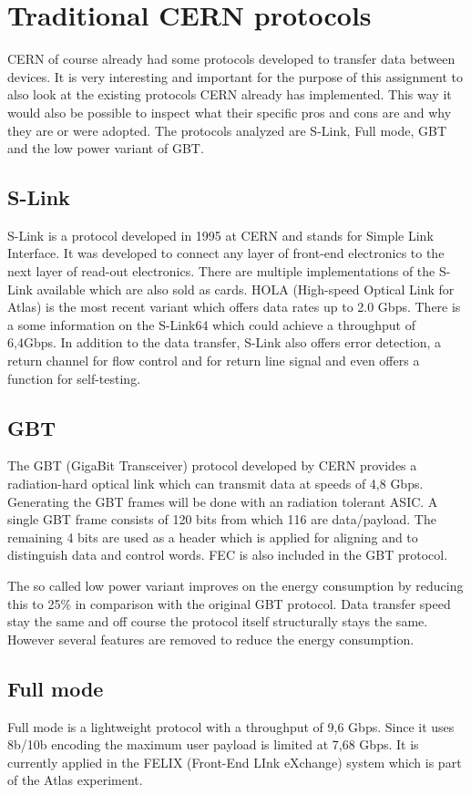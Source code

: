 \section{Traditional CERN protocols}
\label{sec:survey_cern}
CERN of course already had some protocols developed to transfer data between devices. It is very interesting and important for the purpose of this assignment to also look at the existing protocols CERN already has implemented. This way it would also be possible to inspect what their specific pros and cons are and why they are or were adopted. The protocols analyzed are S-Link, Full mode, GBT and the low power variant of GBT.

\subsection{S-Link}
S-Link is a protocol developed in 1995 at CERN and stands for Simple Link Interface. It was developed to connect any layer of front-end electronics to the next layer of read-out electronics. There are multiple implementations of the S-Link available which are also sold as cards. HOLA (High-speed Optical Link for Atlas) is the most recent variant which offers data rates up to 2.0 Gbps.  
There is a some information on the S-Link64 which could achieve a throughput of 6,4Gbps.\cite{S-Link}
In addition to the data transfer, S-Link also offers error detection, a return channel for flow control and for return line signal and even offers a function for self-testing.

\subsection{GBT}
The GBT (GigaBit Transceiver) protocol developed by CERN provides a radiation-hard optical link which can transmit data at speeds of 4,8 Gbps. Generating the GBT frames will be done with an radiation tolerant ASIC.
A single GBT frame consists of 120 bits from which 116 are data/payload. The remaining 4 bits are used as a header which is applied for aligning and to distinguish data and control words. FEC is also included in the GBT protocol. \cite{GBT}

The so called low power variant improves on the energy consumption by reducing this to 25\% in comparison with the original GBT protocol. Data transfer speed stay the same and off course the protocol itself structurally stays the same. However several features are removed to reduce the energy consumption. \cite{GBT_LP}

\subsection{Full mode}
Full mode is a lightweight protocol with a throughput of 9,6 Gbps. Since it uses 8b/10b encoding the maximum user payload is limited at 7,68 Gbps. It is currently applied in the FELIX (Front-End LInk eXchange) system which is part of the Atlas experiment. \cite{FELIX}

\newpage
